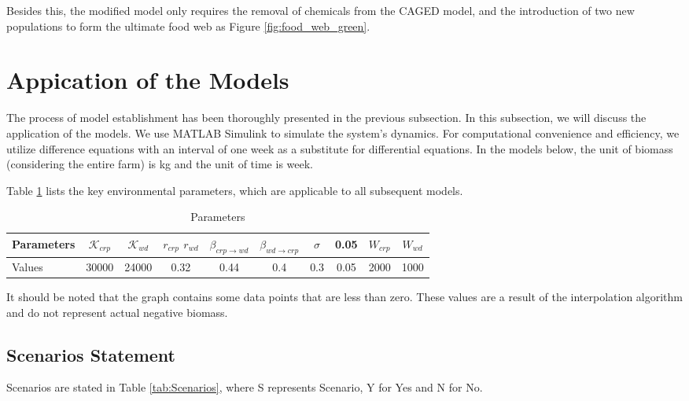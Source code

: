 \documentclass{HZNUMCM}
\begin{document}
      Besides this, the modified model only requires the removal of chemicals from the CAGED model, 
      and the introduction of two new populations to form the ultimate food web as Figure \ref{fig:food_web_green}.

  \section{Appication of the Models}
    The process of model establishment has been thoroughly presented in the previous subsection. 
    In this subsection, we will discuss the application of the models. 
    We use MATLAB Simulink to simulate the system's dynamics. 
    For computational convenience and efficiency, 
    we utilize difference equations with an interval of one week as a substitute for differential equations. 
    In the models below, the unit of biomass (considering the entire farm) is kg and the unit of time is week.
    
    Table \ref{tab:Parameters} lists the key environmental parameters, which are applicable to all subsequent models.
    \begin{table}[H]
      \centering
      \caption{Parameters}
      \begin{tabular}{lccccccccc}
        \toprule
        \rowcolor{customcolor!40} %
        Parameters & $\mathscr{K}_{crp}$ & $\mathscr{K}_{wd}$ & $r_{crp}$ $r_{wd}$ & $\beta_{crp\rightarrow wd}$ & $\beta_{wd\rightarrow crp}$ & $\sigma$ & 0.05 & $W_{crp}$ & $W_{wd}$\\
        \midrule
        Values & 30000 & 24000 & 0.32 & 0.44 & 0.4 & 0.3 & 0.05 & 2000 & 1000\\
        \bottomrule
      \end{tabular}
      \label{tab:Parameters}
    \end{table}

    It should be noted that the graph contains some data points that are less than zero. 
    These values are a result of the interpolation algorithm and do not represent actual negative biomass. 
        
      
      \subsection{Scenarios Statement}
        Scenarios are stated in Table \ref{tab:Scenarios}, where S represents Scenario, Y for Yes and N for No.
\end{document}

